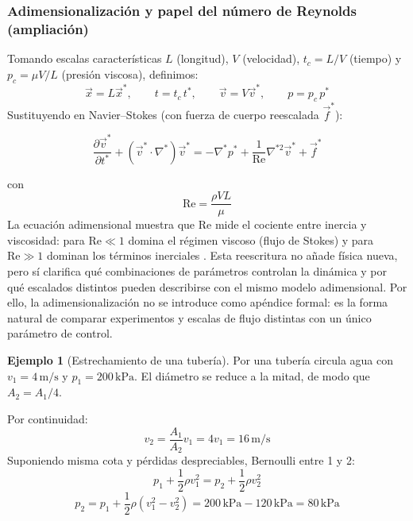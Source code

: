 \documentclass[12pt, a4paper]{article}
\theoremstyle{plain}
\theoremstyle{definition}
\newtheorem{ejemplo}{Ejemplo}[section]
\theoremstyle{remark}
\newcommand{\ve}[1]{\vec{#1}}
\begin{document}
\subsubsection{Adimensionalización y papel del número de Reynolds (ampliación)}

Tomando escalas características $L$ (longitud), $V$ (velocidad),
$t_c=L/V$ (tiempo) y $p_c=\mu V/L$ (presión viscosa), definimos:
\begin{equation}
  \ve{x}=L\ve{x}^*,\qquad
  t=t_c\,t^*,\qquad
  \ve{v}=V\ve{v}^*,\qquad
  p=p_c\,p^*
\end{equation}
Sustituyendo en Navier--Stokes (con fuerza de cuerpo reescalada $\ve{f}^*$):
\begin{mdframed}[style=resultado]
\begin{equation}
  \frac{\partial \ve{v}^*}{\partial t^*}
  +(\ve{v}^*\cdot\nabla^*)\ve{v}^*
  =-\nabla^*p^*
  +\frac{1}{\mathrm{Re}}\nabla^{*2}\ve{v}^*
  +\ve{f}^*
\end{equation}
\end{mdframed}
con
\begin{equation}
  \mathrm{Re}=\frac{\rho V L}{\mu}
\end{equation}
La ecuación adimensional muestra que $\mathrm{Re}$ mide el cociente entre inercia y
viscosidad: para $\mathrm{Re}\ll 1$ domina el régimen viscoso (flujo de Stokes) y para
$\mathrm{Re}\gg 1$ dominan los términos inerciales \cite{mit12005_lec25}.
Esta reescritura no añade física nueva, pero sí clarifica qué combinaciones de parámetros
controlan la dinámica y por qué escalados distintos pueden describirse con el mismo modelo
adimensional.
Por ello, la adimensionalización no se introduce como apéndice formal: es la forma natural
de comparar experimentos y escalas de flujo distintas con un único parámetro de control.

\begin{ejemplo}[Estrechamiento de una tubería]
Por una tubería circula agua con $v_1=4\,\mathrm{m/s}$ y $p_1=200\,\mathrm{kPa}$. El diámetro
se reduce a la mitad, de modo que $A_2=A_1/4$.

Por continuidad:
\begin{equation}
  v_2 = \frac{A_1}{A_2}v_1 = 4v_1 = 16\,\mathrm{m/s}
\end{equation}
Suponiendo misma cota y pérdidas despreciables, Bernoulli entre 1 y 2:
\begin{equation}
  p_1 + \frac{1}{2}\rho v_1^2 = p_2 + \frac{1}{2}\rho v_2^2
\end{equation}
\begin{equation}
  p_2 = p_1 + \frac{1}{2}\rho\left(v_1^2-v_2^2\right)
      = 200\,\mathrm{kPa} - 120\,\mathrm{kPa}
      = 80\,\mathrm{kPa}
\end{equation}
\end{ejemplo}
\end{document}
